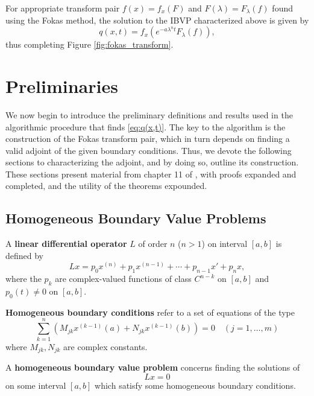 \documentclass[11pt, oneside, a4paper]{article}
\begin{document}
For appropriate transform pair $f(x)=f_x(F)$ and $F(\lambda)=F_\lambda(f)$ found using the Fokas method, the solution to the IBVP characterized above is given by \cite[p.15]{Smith2016}
\begin{equation}\label{eq:q(x,t)}
    q(x,t) = f_x(e^{-a\lambda^n t}F_\lambda(f)),
\end{equation}
thus completing Figure \ref{fig:fokas_transform}.

\section{Preliminaries}
We now begin to introduce the preliminary definitions and results used in the algorithmic procedure that finds \eqref{eq:q(x,t)}. The key to the algorithm is the construction of the Fokas transform pair, which in turn depends on finding a valid adjoint of the given boundary conditions. Thus, we devote the following sections to characterizing the adjoint, and by doing so, outline its construction. These sections present material from chapter 11 of \cite{CoddingtonLevinson}, with proofs expanded and completed, and the utility of the theorems expounded.

\subsection{Homogeneous Boundary Value Problems}
\begin{defn}\cite[p.81]{CoddingtonLevinson}\label{defn:linear differential operator}
    A \textbf{linear differential operator} $L$ of order $n$ ($n>1$) on interval $[a,b]$ is defined by
    \[Lx = p_0x^{(n)} + p_1x^{(n-1)} + \cdots + p_{n-1}x' + p_nx,\]
    where the $p_k$ are complex-valued functions of class $C^{n-k}$ on $[a,b]$ and $p_0(t)\neq 0$ on $[a,b]$.
\end{defn}

\begin{defn}\cite[p.284]{CoddingtonLevinson}\label{defn:homogeneous boundary conditions}
    \textbf{Homogeneous boundary conditions} refer to a set of equations of the type
    \begin{equation}\label{eq:homogeneous boundary conditions}
        \sum_{k=1}^n (M_{jk}x^{(k-1)}(a) + N_{jk}x^{(k-1)}(b))=0 \quad (j=1,\ldots,m) 
    \end{equation}
    where $M_{jk}, N_{jk}$ are complex constants.
\end{defn}

\begin{defn}\cite[p.284]{CoddingtonLevinson}\label{defn:homogeneous boundary value problem}
    A \textbf{homogeneous boundary value problem} concerns finding the solutions of 
    \[Lx=0\] on some interval $[a,b]$ which satisfy some homogeneous boundary conditions.
\end{defn}
\end{document}
